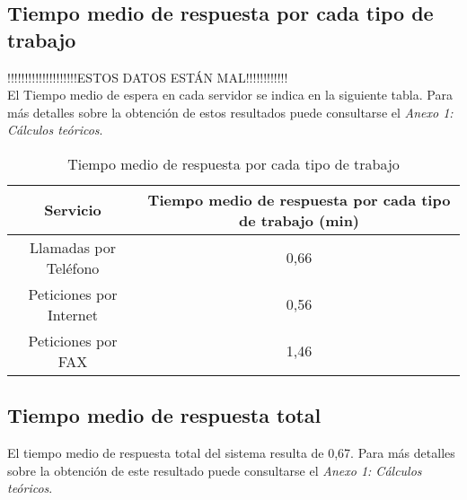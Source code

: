 \subsection{Tiempo medio de respuesta por cada tipo de trabajo}
!!!!!!!!!!!!!!!!!!!!ESTOS DATOS ESTÁN MAL!!!!!!!!!!!!\\
El Tiempo medio de espera en cada servidor se indica en la siguiente tabla. Para más detalles sobre la obtención de estos resultados puede consultarse el \textit{Anexo 1: Cálculos teóricos}.\\

\begin{table}[H]
  \begin{center}
  \begin{tabular}{|c|c|}
    \hline
    \textbf{Servicio}       & \textbf{Tiempo medio de respuesta por cada tipo de trabajo (min)} \\ \hline
    Llamadas por Teléfono   & 0,66                   \\ \hline
    Peticiones por Internet & 0,56                  \\ \hline
    Peticiones por FAX      & 1,46                   \\ \hline
  \end{tabular}
\end{center}
  \caption{Tiempo medio de respuesta por cada tipo de trabajo}
  \end{table}
  
\subsection{Tiempo medio de respuesta total}
El tiempo medio de respuesta total del sistema resulta de 0,67. Para más detalles sobre la obtención de este resultado puede consultarse el \textit{Anexo 1: Cálculos teóricos}.\\